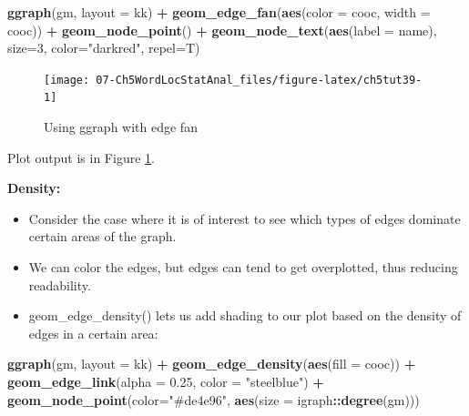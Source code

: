 \documentclass[
]{article}
\newenvironment{Shaded}{\begin{snugshade}}{\end{snugshade}}
\newcommand{\AttributeTok}[1]{\textcolor[rgb]{0.13,0.29,0.53}{#1}}
\newcommand{\DecValTok}[1]{\textcolor[rgb]{0.00,0.00,0.81}{#1}}
\newcommand{\FloatTok}[1]{\textcolor[rgb]{0.00,0.00,0.81}{#1}}
\newcommand{\FunctionTok}[1]{\textcolor[rgb]{0.13,0.29,0.53}{\textbf{#1}}}
\newcommand{\NormalTok}[1]{#1}
\newcommand{\SpecialCharTok}[1]{\textcolor[rgb]{0.81,0.36,0.00}{\textbf{#1}}}
\newcommand{\StringTok}[1]{\textcolor[rgb]{0.31,0.60,0.02}{#1}}
\providecommand{\tightlist}{%
  \setlength{\itemsep}{0pt}\setlength{\parskip}{0pt}}
\begin{document}
\begin{Shaded}
\begin{Highlighting}[]
\FunctionTok{ggraph}\NormalTok{(gm, }\AttributeTok{layout =} \StringTok{\textquotesingle{}kk\textquotesingle{}}\NormalTok{) }\SpecialCharTok{+} 
     \FunctionTok{geom\_edge\_fan}\NormalTok{(}\FunctionTok{aes}\NormalTok{(}\AttributeTok{color =}\NormalTok{ cooc, }\AttributeTok{width =}\NormalTok{ cooc)) }\SpecialCharTok{+}
     \FunctionTok{geom\_node\_point}\NormalTok{() }\SpecialCharTok{+}
     \FunctionTok{geom\_node\_text}\NormalTok{(}\FunctionTok{aes}\NormalTok{(}\AttributeTok{label =}\NormalTok{ name), }\AttributeTok{size=}\DecValTok{3}\NormalTok{, }\AttributeTok{color=}\StringTok{"darkred"}\NormalTok{, }
                    \AttributeTok{repel=}\NormalTok{T)}
\end{Highlighting}
\end{Shaded}

\begin{figure}

{\centering \texttt{[image: 07-Ch5WordLocStatAnal\_files/figure-latex/ch5tut39-1]} 

}

\caption{Using ggraph with edge fan}\label{fig:ch5tut39}
\end{figure}

Plot output is in Figure \ref{fig:ch5tut39}.

\textbf{Density:}

\begin{itemize}
\tightlist
\item
  Consider the case where it is of interest to see which types of edges dominate certain areas of the graph.
\item
  We can color the edges, but edges can tend to get overplotted, thus reducing readability.
\item
  geom\_edge\_density() lets us add shading to our plot based on the density of edges in a certain area:
\end{itemize}

\begin{Shaded}
\begin{Highlighting}[]
\FunctionTok{ggraph}\NormalTok{(gm, }\AttributeTok{layout =} \StringTok{\textquotesingle{}kk\textquotesingle{}}\NormalTok{) }\SpecialCharTok{+} 
     \FunctionTok{geom\_edge\_density}\NormalTok{(}\FunctionTok{aes}\NormalTok{(}\AttributeTok{fill =}\NormalTok{ cooc)) }\SpecialCharTok{+} 
     \FunctionTok{geom\_edge\_link}\NormalTok{(}\AttributeTok{alpha =} \FloatTok{0.25}\NormalTok{, }\AttributeTok{color =} \StringTok{"steelblue"}\NormalTok{) }\SpecialCharTok{+}
     \FunctionTok{geom\_node\_point}\NormalTok{(}\AttributeTok{color=}\StringTok{"\#de4e96"}\NormalTok{, }\FunctionTok{aes}\NormalTok{(}\AttributeTok{size =}\NormalTok{ igraph}\SpecialCharTok{::}\FunctionTok{degree}\NormalTok{(gm)))}
\end{Highlighting}
\end{Shaded}
\end{document}
